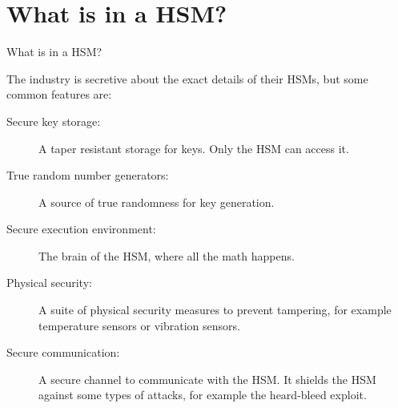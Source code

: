 \section{What is in a HSM?}
\begin{frame}{What is in a HSM?}
    \begin{wide}
        The industry is secretive about the exact details of their HSMs, but some common features are:
            \begin{description}
                \item[Secure key storage:] A taper resistant storage for keys. Only the HSM can access it.
                \item[True random number generators:] A source of true randomness for key generation.
                \item[Secure execution environment:] The brain of the HSM, where all the math happens.
                \item[Physical security:] A suite of physical security measures to prevent tampering, for example temperature sensors or vibration sensors.
                \item[Secure communication:] A secure channel to communicate with the HSM. It shields the HSM against some types of attacks, for example the heard-bleed exploit.
            \end{description}
    \end{wide}
\end{frame}